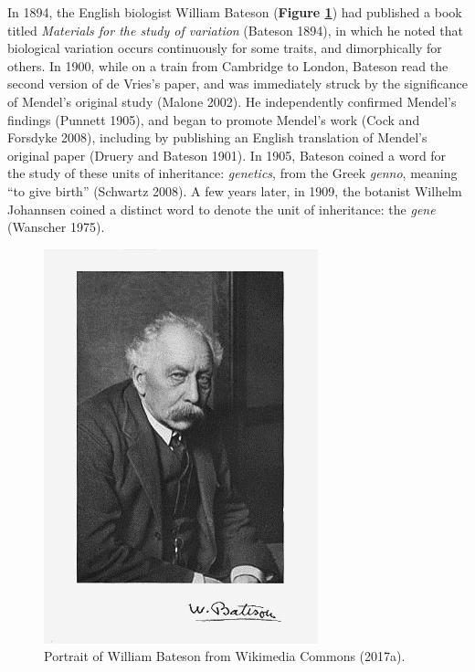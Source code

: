 \documentclass[
]{book}
\begin{document}
In 1894, the English biologist William Bateson (\textbf{Figure \ref{fig:bateson}}) had published a book titled \emph{Materials for the study of variation} (Bateson 1894), in which he noted that biological variation occurs continuously for some traits, and dimorphically for others. In 1900, while on a train from Cambridge to London, Bateson read the second version of de Vries's paper, and was immediately struck by the significance of Mendel's original study (Malone 2002). He independently confirmed Mendel's findings (Punnett 1905), and began to promote Mendel's work (Cock and Forsdyke 2008), including by publishing an English translation of Mendel's original paper (Druery and Bateson 1901). In 1905, Bateson coined a word for the study of these units of inheritance: \emph{genetics}, from the Greek \emph{genno}, meaning ``to give birth'' (Schwartz 2008). A few years later, in 1909, the botanist Wilhelm Johannsen coined a distinct word to denote the unit of inheritance: the \emph{gene} (Wanscher 1975).



\begin{figure}

{\centering \includegraphics[width=1\linewidth]{figs/introduction/Bateson2} 

}

\caption{Portrait of William Bateson from Wikimedia Commons (2017a).}\label{fig:bateson}
\end{figure}
\end{document}
